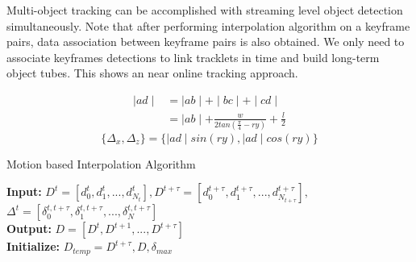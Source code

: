 \documentclass[letterpaper, 10 pt, conference]{ieeeconf}  %
\begin{document}
Multi-object tracking can be accomplished with streaming level object detection simultaneously. Note that after performing interpolation algorithm on a keyframe pairs, data association between keyframe pairs is also obtained. We only need to associate keyframes detections to link tracklets in time and build long-term object tubes. This shows an near online tracking approach.

\vspace{-0.2cm}
\begin{equation}
\begin{split}
\mid ad \mid   &= \mid ab \mid + \mid bc \mid + \mid cd \mid  \\
&= \mid ab \mid + \frac{w}{2tan(\frac{\pi}{4} - ry)} + \frac{l}{2}
\end{split}
\end{equation}
\begin{equation}
\{\Delta_x, \Delta_z\} = \{\mid ad \mid sin(ry), \mid ad \mid cos(ry)\}
\label{offsets}
\end{equation}


\begin{algorithm}[t]
	\small
	\caption{Motion based Interpolation Algorithm}
	\label{alg:interpolation}
	\textbf{Input: }$D^t= [d^t_0, d^t_1, ..., d^t_{N_t}], D^{t+\tau}= [d^{t+\tau}_0, d^{t+\tau}_1, ..., d^{t+\tau}_{N_{t+\tau}}],$
	$\Delta^t=[\delta^{t, t+\tau}_0, \delta^{t, t+\tau}_1, ..., \delta^{t, t+\tau}_{N}]$\\
	\textbf{Output: } $D = [D^t, D^{t+1}, ..., D^{t+\tau}]$\\
	\textbf{Initialize:} $D_{temp} = D^{t+\tau}, D, \delta_{max}$ \\
\end{algorithm}
\setlength{\textfloatsep}{2pt}%
\end{document}
